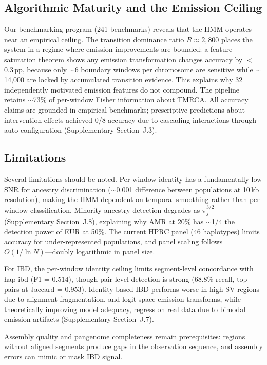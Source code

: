 \subsection{Algorithmic Maturity and the Emission Ceiling}

Our benchmarking program (241 benchmarks) reveals that the HMM operates near an empirical ceiling. The transition dominance ratio $R \approx 2{,}800$ places the system in a regime where emission improvements are bounded: a feature saturation theorem shows any emission transformation changes accuracy by $<$0.3\,pp, because only $\sim$6 boundary windows per chromosome are sensitive while $\sim$14{,}000 are locked by accumulated transition evidence. This explains why 32 independently motivated emission features do not compound. The pipeline retains $\sim$73\% of per-window Fisher information about TMRCA. All accuracy claims are grounded in empirical benchmarks; prescriptive predictions about intervention effects achieved 0/8 accuracy due to cascading interactions through auto-configuration (Supplementary Section~J.3).

\subsection{Limitations}

Several limitations should be noted. Per-window identity has a fundamentally low SNR for ancestry discrimination ($\sim$0.001 difference between populations at 10\,kb resolution), making the HMM dependent on temporal smoothing rather than per-window classification. Minority ancestry detection degrades as $\pi_j^{3/2}$ (Supplementary Section~J.8), explaining why AMR at 20\% has $\sim$1/4 the detection power of EUR at 50\%. The current HPRC panel (46 haplotypes) limits accuracy for under-represented populations, and panel scaling follows $O(1/\ln N)$---doubly logarithmic in panel size.

For IBD, the per-window identity ceiling limits segment-level concordance with hap-ibd (F1 = 0.514), though pair-level detection is strong (68.8\% recall, top pairs at Jaccard = 0.953). Identity-based IBD performs worse in high-SV regions due to alignment fragmentation, and logit-space emission transforms, while theoretically improving model adequacy, regress on real data due to bimodal emission artifacts (Supplementary Section~J.7).

Assembly quality and pangenome completeness remain prerequisites: regions without aligned segments produce gaps in the observation sequence, and assembly errors can mimic or mask IBD signal.

